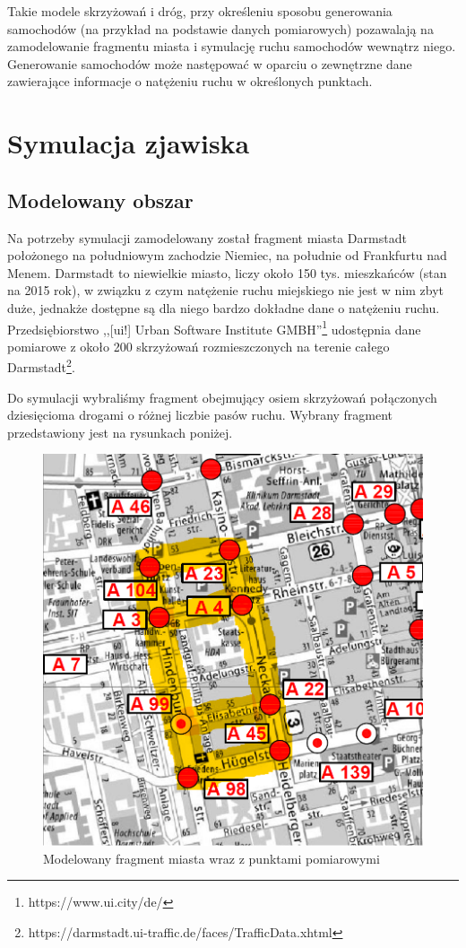 \documentclass[a4paper,12pt]{article}
\begin{document}
Takie modele skrzyżowań i dróg, przy określeniu sposobu generowania samochodów (na przykład na podstawie danych pomiarowych) pozawalają na zamodelowanie fragmentu miasta i symulację ruchu samochodów wewnątrz niego. Generowanie samochodów może następować w oparciu o zewnętrzne dane zawierające informacje o natężeniu ruchu w określonych punktach. 
\section{Symulacja zjawiska}
\subsection*{Modelowany obszar}
Na potrzeby symulacji zamodelowany został fragment miasta Darmstadt położonego na południowym zachodzie Niemiec, na południe od Frankfurtu nad Menem. Darmstadt to niewielkie miasto, liczy około 150 tys. mieszkańców (stan na 2015 rok), w związku z czym natężenie ruchu miejskiego nie jest w nim zbyt duże, jednakże dostępne są dla niego bardzo dokładne dane o natężeniu ruchu. Przedsiębiorstwo ,,[ui!] Urban Software Institute GMBH''\footnote{https://www.ui.city/de/} udostępnia dane pomiarowe z około 200 skrzyżowań rozmieszczonych na terenie całego Darmstadt\footnote{https://darmstadt.ui-traffic.de/faces/TrafficData.xhtml}. 

Do symulacji wybraliśmy fragment obejmujący osiem skrzyżowań połączonych dziesięcioma drogami o różnej liczbie pasów ruchu. Wybrany fragment przedstawiony jest na rysunkach poniżej. 

\begin{figure}[!h]
	\centering
	\includegraphics[scale=0.4]{darmstadt.png}
	\caption{Modelowany fragment miasta wraz z punktami pomiarowymi}
	\label{fig:darmstadt}
\end{figure}
\end{document}
